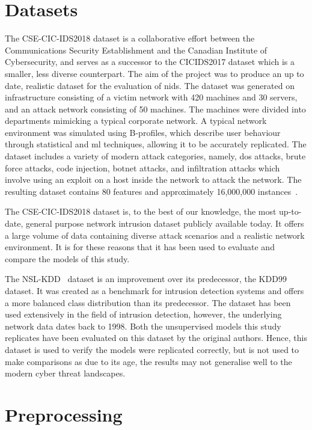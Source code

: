 \section{Datasets}%
\label{sec:datasets}
The CSE-CIC-IDS2018 dataset is a collaborative effort between the
Communications Security Establishment and the Canadian Institute of
Cybersecurity,
and serves as a successor to the CICIDS2017 dataset which is a smaller, less
diverse counterpart. The aim of the project was to produce an up to date,
realistic dataset for the evaluation of \gls{nids}. The dataset was generated
on infrastructure consisting of a victim network with 420 machines and 30
servers, and an attack network consisting of 50 machines. The machines were
divided into departments mimicking a typical corporate network. A typical
network environment was simulated using B-profiles, which describe user
behaviour through statistical and \gls{ml} techniques, allowing it to be
accurately replicated. The dataset includes a variety of modern attack
categories, namely, \gls{dos} attacks, brute force attacks, code injection,
botnet attacks, and infiltration attacks which involve using an exploit on a
host inside the network to attack the network. The resulting dataset contains
80 features and approximately 16,000,000 instances~\cite{cic2018, cic2018data}.

The CSE-CIC-IDS2018 dataset is, to the best of our knowledge, the most
up-to-date, general purpose network intrusion dataset publicly available today.
It offers a large volume of data containing diverse attack scenarios and a
realistic network environment. It is for these reasons that it has been used to
evaluate and compare the models of this study.

The NSL-KDD~\cite{nsl} dataset is an improvement over its predecessor, the
KDD99 dataset. It was created as a benchmark for intrusion detection systems
and offers a more balanced class distribution than its predecessor. The dataset
has been used extensively in the field of intrusion detection, however, the
underlying network data dates back to 1998. Both the unsupervised models this
study replicates have been evaluated on this dataset by the original
authors. Hence, this dataset is used to verify the models were replicated
correctly, but is not used to make comparisons as due to its age, the
results may not generalise well to the modern cyber threat landscapes.

\section{Preprocessing}%
\label{sec:preprocessing}

